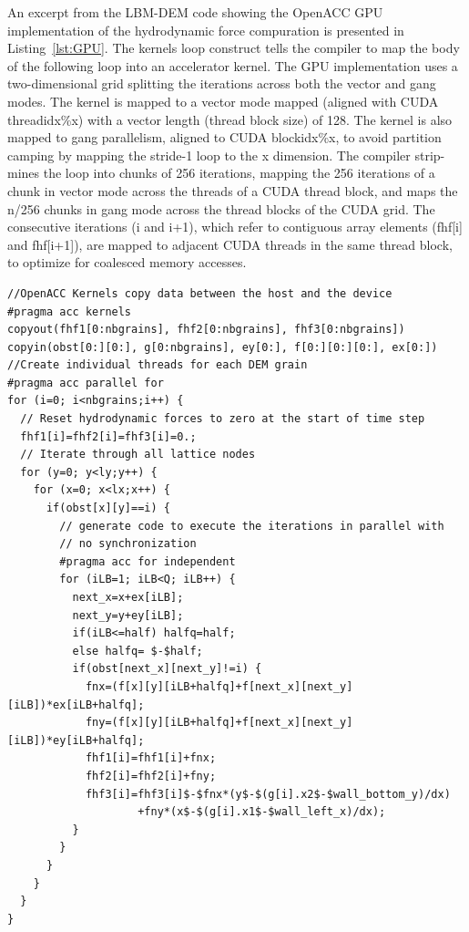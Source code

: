 An excerpt from the LBM-DEM code showing the OpenACC GPU implementation of the 
hydrodynamic force compuration is presented in Listing~\ref{lst:GPU}. The 
kernels loop construct tells the compiler to map the body of the following loop 
into an accelerator kernel. The GPU implementation uses a two-dimensional grid 
splitting the iterations across both the vector and gang modes. The kernel is 
mapped to a vector mode mapped (aligned with CUDA threadidx\%x) with a vector 
length (thread block size) of 128. The kernel is also mapped to gang 
parallelism, aligned to CUDA blockidx\%x, to avoid partition camping by mapping 
the stride-1 loop to the x dimension. The compiler strip-mines the loop into 
chunks of 256 iterations, mapping the 256 iterations of a chunk in vector mode 
across the threads of a CUDA thread block, and maps the n/256 chunks in gang 
mode across the thread blocks of the CUDA grid. The consecutive iterations (i 
and i+1), which refer to contiguous array elements (fhf[i] and fhf[i+1]), are 
mapped to adjacent CUDA threads in the same thread block, to optimize for 
coalesced memory accesses. 



\begin{lstlisting}[label=lst:GPU,caption= OpenACC GPU implementation of the 
hydrodynamic force computation.,style=customcpp]
//OpenACC Kernels copy data between the host and the device
#pragma acc kernels 
copyout(fhf1[0:nbgrains], fhf2[0:nbgrains], fhf3[0:nbgrains]) 
copyin(obst[0:][0:], g[0:nbgrains], ey[0:], f[0:][0:][0:], ex[0:])
//Create individual threads for each DEM grain
#pragma acc parallel for
for (i=0; i<nbgrains;i++) {
  // Reset hydrodynamic forces to zero at the start of time step
  fhf1[i]=fhf2[i]=fhf3[i]=0.;
  // Iterate through all lattice nodes
  for (y=0; y<ly;y++) {
    for (x=0; x<lx;x++) {
      if(obst[x][y]==i) {
        // generate code to execute the iterations in parallel with
        // no synchronization
        #pragma acc for independent
        for (iLB=1; iLB<Q; iLB++) {
          next_x=x+ex[iLB];
          next_y=y+ey[iLB];
          if(iLB<=half) halfq=half;
          else halfq= $-$half;
          if(obst[next_x][next_y]!=i) {
            fnx=(f[x][y][iLB+halfq]+f[next_x][next_y][iLB])*ex[iLB+halfq];
            fny=(f[x][y][iLB+halfq]+f[next_x][next_y][iLB])*ey[iLB+halfq];
            fhf1[i]=fhf1[i]+fnx;
            fhf2[i]=fhf2[i]+fny;
            fhf3[i]=fhf3[i]$-$fnx*(y$-$(g[i].x2$-$wall_bottom_y)/dx) 
                    +fny*(x$-$(g[i].x1$-$wall_left_x)/dx);
          }			
        }
      }
    }
  }
}
\end{lstlisting}

